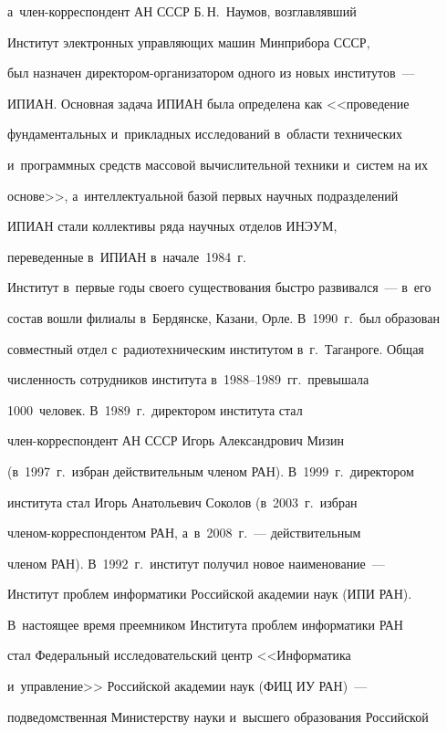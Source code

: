 а~член-кор\-рес\-пон\-дент АН \mbox{СССР} Б.\,Н.~Наумов, возглавлявший 

Институт электронных управ\-ля\-ющих машин Минприбора \mbox{СССР}, 

был на\-зна\-чен ди\-рек\-то\-ром-ор\-га\-ни\-за\-то\-ром одного из новых институтов~--- 

\mbox{ИПИАН}. Основ\-ная задача ИПИАН была определена как <<проведение 

фундаментальных и~при\-клад\-ных исследований в~об\-ласти технических 

и~про\-грам\-мных средств массовой вы\-чис\-ли\-тель\-ной техники и~сис\-тем на их 

основе>>, а~интеллектуальной базой пер\-вых научных под\-раз\-де\-ле\-ний 

\mbox{ИПИАН} стали коллективы ряда научных отделов \mbox{ИНЭУМ}, 

переведенные в~\mbox{ИПИАН} в~начале~1984~г.

   

   Институт в~первые годы своего существования быстро развивался~--- в~его 

состав вошли филиалы в~Бердянске, Казани, Орле. В~1990~г.\ был образован 

совместный отдел с~радиотехническим институтом в~г.~Таганроге. Общая 

чис\-лен\-ность со\-труд\-ни\-ков института в~1988--1989~гг.\ превышала 

1000~человек. В~1989~г.\ директором института стал  

член-кор\-рес\-пон\-дент АН \mbox{СССР} Игорь Александрович Мизин 

(в~1997~г.\ из\-бран действительным членом РАН). В~1999~г.\ директором 

института стал Игорь Анатольевич Соколов (в~2003~г.\ избран  

чле\-ном-кор\-рес\-пон\-ден\-том РАН, а~в~2008~г.~--- действительным 

членом РАН). В~1992~г.\ институт получил новое наименование~--- 

Институт проб\-лем информатики Российской академии наук (ИПИ РАН). 

В~на\-сто\-ящее время преемником Института проб\-лем информатики РАН 

стал Федеральный исследовательский центр <<Информатика  

и~управ\-ле\-ние>> Российской академии наук (ФИЦ ИУ РАН)~--- 

подведомственная Министерству науки и~высшего образования Российской 


